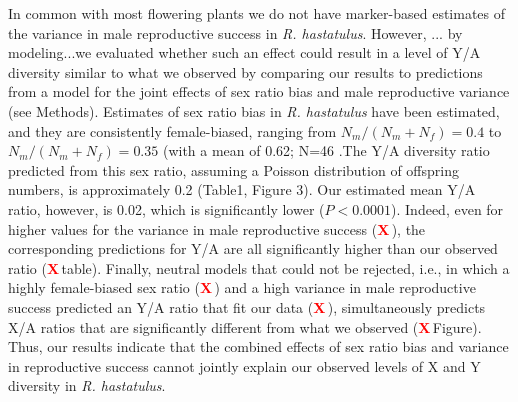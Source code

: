 \documentclass[9pt,twocolumn,twoside]{gsajnl}
\newcommand{\X}{\textcolor{red}{\bf X\,}}
\begin{document}
 In common with most flowering plants we do not have marker-based estimates of the variance in male reproductive success in \textit{R. hastatulus}. However, ... by modeling...we evaluated whether such an effect could result in a level of Y/A diversity similar to what we observed by comparing our results to predictions from a  model for the joint effects of sex ratio bias and male reproductive variance (see Methods). Estimates of sex ratio bias in \textit{R. hastatulus} have been estimated, and they are consistently female-biased, ranging from $N_{m}/(N_{m}+N_{f})=0.4$ to $N_{m}/(N_{m}+N_{f})=0.35$ (with a mean of 0.62; N=46 \citep{pickup2013influence}.The Y/A diversity ratio predicted from this sex ratio, assuming a Poisson distribution of offspring numbers, is approximately 0.2 (Table1, Figure 3). Our estimated mean Y/A ratio, however, is 0.02, which is significantly lower ($\textit{P}<0.0001$). Indeed, even for higher values for the variance in male reproductive success (\X), the corresponding predictions for Y/A are all significantly higher than our observed ratio (\X table). Finally, neutral models that could not be rejected, i.e., in which a highly female-biased sex ratio (\X) and a high variance in male reproductive success predicted an Y/A ratio that fit our data (\X), simultaneously predicts X/A ratios that are significantly different from what we observed (\X Figure). Thus, our results indicate that the combined effects of sex ratio bias and variance in reproductive success cannot jointly explain our observed levels of X and Y diversity in \textit{R. hastatulus}.

 
\end{document}
